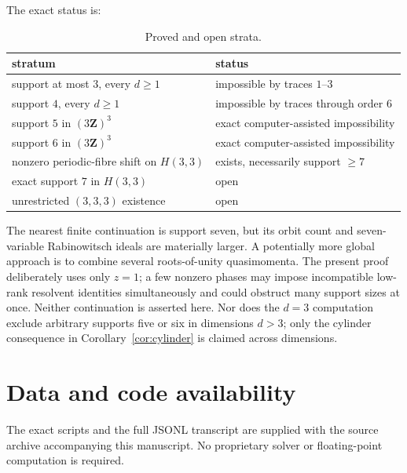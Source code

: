 \documentclass[11pt,reqno]{amsart}
\theoremstyle{definition}
\theoremstyle{remark}
\newcommand{\Z}{\mathbf Z}
\begin{document}
The exact status is:
\begin{table}[htbp]
\centering
\caption{Proved and open strata.}
\label{tab:status}
\begin{tabular}{>{\raggedright\arraybackslash}p{}
                >{\raggedright\arraybackslash}p{}}
\toprule
stratum & status\\
\midrule
support at most $3$, every $d\geq1$ & impossible by traces $1$--$3$\\
support $4$, every $d\geq1$ & impossible by traces through order $6$\\
support $5$ in $(3\Z)^3$ & exact computer-assisted impossibility\\
support $6$ in $(3\Z)^3$ & exact computer-assisted impossibility\\
nonzero periodic-fibre shift on $H(3,3)$ & exists, necessarily support $\geq7$\\
exact support $7$ in $H(3,3)$ & open\\
unrestricted $(3,3,3)$ existence & open\\
\bottomrule
\end{tabular}
\end{table}

The nearest finite continuation is support seven, but its orbit count and
seven-variable Rabinowitsch ideals are materially larger.  A potentially more
global approach is to combine several roots-of-unity quasimomenta.  The
present proof deliberately uses only $z=1$; a few nonzero phases may impose
incompatible low-rank resolvent identities simultaneously and could obstruct
many support sizes at once.  Neither continuation is asserted here.  Nor does
the $d=3$ computation exclude arbitrary supports five or six in dimensions
$d>3$; only the cylinder consequence in Corollary~\ref{cor:cylinder} is
claimed across dimensions.

\section*{Data and code availability}

The exact scripts and the full JSONL transcript are supplied with the source
archive accompanying this manuscript.  No proprietary solver or
floating-point computation is required.
\end{document}
